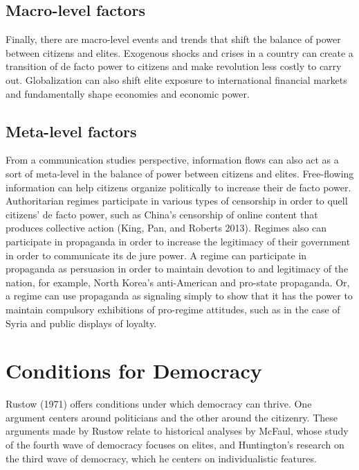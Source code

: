\documentclass[12pt,]{article}
\begin{document}
\hypertarget{macro-level-factors}{%
\subsection{Macro-level factors}\label{macro-level-factors}}

Finally, there are macro-level events and trends that shift the balance
of power between citizens and elites. Exogenous shocks and crises in a
country can create a transition of de facto power to citizens and make
revolution less costly to carry out. Globalization can also shift elite
exposure to international financial markets and fundamentally shape
economies and economic power.

\hypertarget{meta-level-factors}{%
\subsection{Meta-level factors}\label{meta-level-factors}}

From a communication studies perspective, information flows can also act
as a sort of meta-level in the balance of power between citizens and
elites. Free-flowing information can help citizens organize politically
to increase their de facto power. Authoritarian regimes participate in
various types of censorship in order to quell citizens' de facto power,
such as China's censorship of online content that produces collective
action (King, Pan, and Roberts 2013). Regimes also can participate in
propaganda in order to increase the legitimacy of their government in
order to communicate its de jure power. A regime can participate in
propaganda as persuasion in order to maintain devotion to and legitimacy
of the nation, for example, North Korea's anti-American and pro-state
propaganda. Or, a regime can use propaganda as signaling simply to show
that it has the power to maintain compulsory exhibitions of pro-regime
attitudes, such as in the case of Syria and public displays of loyalty.

\hypertarget{conditions-for-democracy}{%
\section{Conditions for Democracy}\label{conditions-for-democracy}}

Rustow (1971) offers conditions under which democracy can thrive. One
argument centers around politicians and the other around the citizenry.
These arguments made by Rustow relate to historical analyses by McFaul,
whose study of the fourth wave of democracy focuses on elites, and
Huntington's research on the third wave of democracy, which he centers
on individualistic features.
\end{document}
